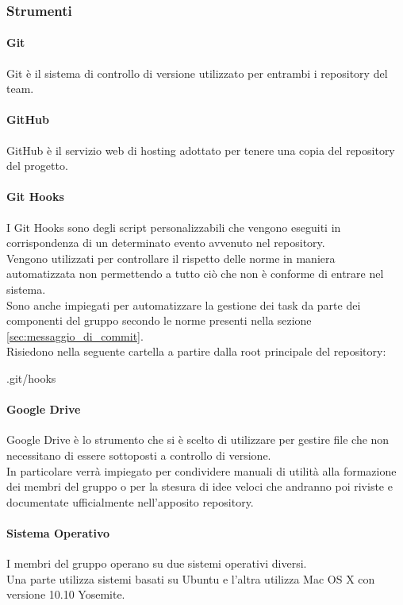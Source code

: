 		\subsubsection{Strumenti}
			\paragraph{Git}
			Git\gloss{} è il sistema di controllo di versione utilizzato per entrambi i repository\gloss{} del team.	
			\paragraph{GitHub}
			GitHub\gloss{} è il servizio web di hosting adottato per tenere una copia del repository\gloss{} del progetto.
			\paragraph{Git Hooks}
			I Git\gloss{} Hooks sono degli script personalizzabili che vengono eseguiti in corrispondenza di un determinato evento avvenuto nel repository\gloss{}. \\
			Vengono utilizzati per controllare il rispetto delle norme in maniera automatizzata non permettendo a tutto ciò che non è conforme di entrare nel sistema. \\
			Sono anche impiegati per automatizzare la gestione dei task da parte dei componenti del gruppo secondo le norme presenti nella sezione \ref{sec:messaggio_di_commit}. \\
			Risiedono nella seguente cartella a partire dalla root principale del repository\gloss{}:
				\begin{center}
					.git\gloss{}/hooks
				\end{center}
			\paragraph{Google Drive}
			\label{sec:google_drive}
			Google Drive è lo strumento che si è scelto di utilizzare per gestire file che non necessitano di essere sottoposti a controllo di versione. \\
			In particolare verrà impiegato per condividere manuali di utilità alla formazione dei membri del gruppo o per la stesura di idee veloci che andranno poi riviste e documentate ufficialmente nell'apposito repository\gloss{}.
			\paragraph{Sistema Operativo}
			I membri del gruppo operano su due sistemi operativi diversi. \\
			Una parte utilizza sistemi basati su Ubuntu e l'altra utilizza Mac OS X con versione 10.10 Yosemite.

